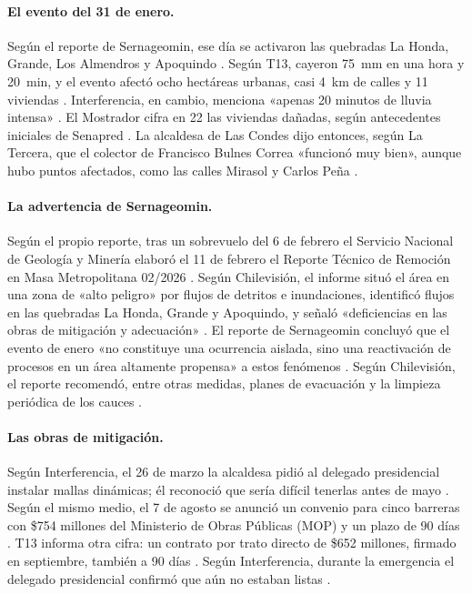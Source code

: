 \paragraph{El evento del 31 de enero.} Según el reporte de Sernageomin, ese día se activaron las quebradas La Honda, Grande, Los Almendros y Apoquindo \citep{sernageomin2026reterm}. Según T13, cayeron \SI{75}{mm} en una hora y \SI{20}{min}, y el evento afectó ocho hectáreas urbanas, casi \SI{4}{km} de calles y 11 viviendas \citep{t13_2026mallas}. Interferencia, en cambio, menciona «apenas 20 minutos de lluvia intensa» \citep{interferencia2026}. El Mostrador cifra en 22 las viviendas dañadas, según antecedentes iniciales de Senapred \citep{elmostrador2026}. La alcaldesa de Las Condes dijo entonces, según La Tercera, que el colector de Francisco Bulnes Correa «funcionó muy bien», aunque hubo puntos afectados, como las calles Mirasol y Carlos Peña \citep{latercera2026enero}.

\paragraph{La advertencia de Sernageomin.} Según el propio reporte, tras un sobrevuelo del 6 de febrero el Servicio Nacional de Geología y Minería elaboró el 11 de febrero el Reporte Técnico de Remoción en Masa Metropolitana 02/2026 \citep{sernageomin2026reterm}. Según Chilevisión, el informe situó el área en una zona de «alto peligro» por flujos de detritos e inundaciones, identificó flujos en las quebradas La Honda, Grande y Apoquindo, y señaló «deficiencias en las obras de mitigación y adecuación» \citep{chilevision2026}. El reporte de Sernageomin concluyó que el evento de enero «no constituye una ocurrencia aislada, sino una reactivación de procesos en un área altamente propensa» a estos fenómenos \citep{sernageomin2026reterm}. Según Chilevisión, el reporte recomendó, entre otras medidas, planes de evacuación y la limpieza periódica de los cauces \citep{chilevision2026}.

\paragraph{Las obras de mitigación.} Según Interferencia, el 26 de marzo la alcaldesa pidió al delegado presidencial instalar mallas dinámicas; él reconoció que sería difícil tenerlas antes de mayo \citep{interferencia2026}. Según el mismo medio, el 7 de agosto se anunció un convenio para cinco barreras con \$754 millones del Ministerio de Obras Públicas (MOP) y un plazo de 90 días \citep{interferencia2026}. T13 informa otra cifra: un contrato por trato directo de \$652 millones, firmado en septiembre, también a 90 días \citep{t13_2026mallas}. Según Interferencia, durante la emergencia el delegado presidencial confirmó que aún no estaban listas \citep{interferencia2026}.

